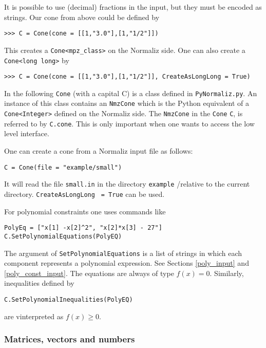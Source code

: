 \begin{small}
It is possible to use (decimal) fractions in the input, but they must be encoded as strings. Our cone from above could be defined by
\begin{Verbatim}
>>> C = Cone(cone = [[1,"3.0"],[1,"1/2"]])
\end{Verbatim}
This creates a \verb|Cone<mpz_class>| on the Normaliz side. One can also create a \verb|Cone<long long>| by
\begin{Verbatim}
>>> C = Cone(cone = [[1,"3.0"],[1,"1/2"]], CreateAsLongLong = True)
\end{Verbatim}

In the following \verb|Cone| (with a capital C) is a class defined in \verb|PyNormaliz.py|. An instance of this class contains an \verb|NmzCone| which is the Python equivalent of a \verb|Cone<Integer>| defined on the Normaliz side. The \verb|NmzCone| in the \verb|Cone| \verb|C|, is referred to by \verb|C.cone|. This is only important when one wants to access the low level interface.

One can create a cone from a Normaliz input file as follows:
\begin{Verbatim}
C = Cone(file = "example/small")
\end{Verbatim}
It will read the file \verb|small.in| in the directory \verb|example| /relative to the current directory.  \verb|CreateAsLongLong| \verb| = True| can be used.

For polynomial constraints one uses commands like
\begin{Verbatim}
PolyEq = ["x[1] -x[2]^2", "x[2]*x[3] - 27"]
C.SetPolynomialEquations(PolyEQ)
\end{Verbatim}
The argument of \verb|SetPolynomialEquations| is a list of strings in which each component represents a polynomial expression. See Sections \ref{poly_input} and \ref{poly_const_input}. The equations are always of type $f(x) = 0$. Similarly, inequalities defined by
\begin{Verbatim}
C.SetPolynomialInequalities(PolyEQ)
\end{Verbatim}
are vinterpreted as $f(x) \ge 0$.

\subsubsection{Matrices, vectors and numbers}


\end{small}
